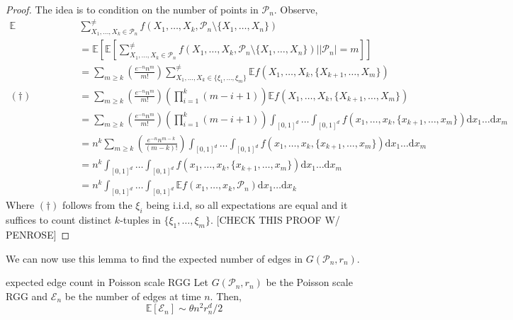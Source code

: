 \documentclass{article}
\begin{document}
\begin{proof}
The idea is to condition on the number of points in $\mathcal{P}_n$. Observe, 
\begin{align*}
    \mathbb{E}&\sum_{X_1, \dots, X_k \in \mathcal{P}_n}^{\neq} f(X_1, \dots, X_k, \mathcal{P}_n \setminus \{X_1, \dots, X_n\}) \\
    &= \mathbb{E}\left[\mathbb{E}\left[\sum_{X_1, \dots, X_k \in \mathcal{P}_n}^{\neq} f(X_1, \dots, X_k, \mathcal{P}_n \setminus \{X_1, \dots, X_n\}) \bigg| |\mathcal{P}_n| = m\right]\right] \\
    &= \sum_{m \geq k}\left(\frac{e^{-n}n^m}{m!}\right)\sum_{X_1, \dots, X_k \in \{\xi_1, \dots, \xi_m\}}^{\neq}\mathbb{E}f(X_1, \dots, X_k, \{X_{k+1}, \dots, X_{m}\}) \\
    (\dagger) \qquad \qquad &= \sum_{m \geq k}\left(\frac{e^{-n}n^m}{m!}\right)\left(\prod_{i = 1}^{k}(m-i+1)\right)\mathbb{E}f(X_1, \dots, X_k, \{X_{k+1}, \dots, X_{m}\}) \\ 
    &= \sum_{m \geq k}\left(\frac{e^{-n}n^m}{m!}\right)\left(\prod_{i = 1}^{k}(m-i+1)\right)\int_{[0,1]^d} \dots \int_{[0,1]^d} f(x_1, \dots, x_k, \{x_{k+1}, \dots, x_m\})\mathrm{d}x_1 \dots \mathrm{d}x_m \\
    &= n^k \sum_{m \geq k}\left(\frac{e^{-n}n^{m-k}}{(m-k)!}\right) \int_{[0,1]^d} \dots \int_{[0,1]^d} f(x_1, \dots, x_k, \{x_{k+1}, \dots, x_m\})\mathrm{d}x_1 \dots \mathrm{d}x_m \\
    &= n^k \int_{[0,1]^d} \dots \int_{[0,1]^d} f(x_1, \dots, x_k, \{x_{k+1}, \dots, x_m\})\mathrm{d}x_1 \dots \mathrm{d}x_m  \\
    &= n^k \int_{[0,1]^d} \dots \int_{[0,1]^d} \mathbb{E}f(x_1, \dots, x_k, \mathcal{P}_n)\mathrm{d}x_1 \dots \mathrm{d}x_k
\end{align*}
Where $(\dagger)$ follows from the $\xi_i$ being i.i.d, so all expectations are equal and it suffices to count 
distinct $k$-tuples in $\{\xi_1, \dots, \xi_m\}$. [CHECK THIS PROOF W/ PENROSE]
\end{proof}

We can now use this lemma to find the expected number of edges in $G(\mathcal{P}_n, r_n)$. 

\begin{proposition}[]{expected edge count in Poisson scale RGG}
    Let $G(\mathcal{P}_n, r_n)$ be the Poisson scale RGG and $\mathcal{E}_n$ be the number of edges at time $n$. Then, 
    \[\mathbb{E}[\mathcal{E}_n] \sim \theta n^2 r_n^d / 2\]
\end{proposition}
\end{document}
